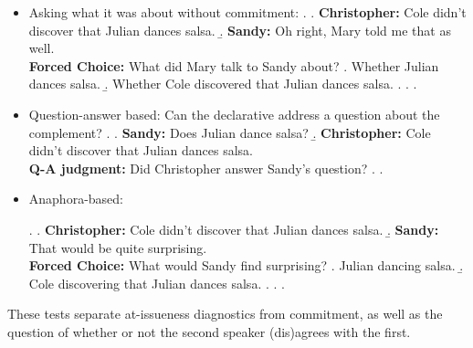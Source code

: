 \documentclass[11pt]{article}
\begin{document}
		\begin{itemize}
			\item Asking what it was about without commitment:
				\ex. \a. \textbf{Christopher:} Cole didn’t discover that Julian dances salsa.
					\b. \textbf{Sandy:} Oh right, Mary told me that as well.\\
					\textbf{Forced Choice:} What did Mary talk to Sandy about?
						\a. Whether Julian dances salsa.
						\b. Whether Cole discovered that Julian dances salsa.
						\z.
					\z.
				\z.

			\item Question-answer based: Can the declarative address a question about the complement?
				\ex. \a. \textbf{Sandy:} Does Julian dance salsa?
					\b. \textbf{Christopher:} Cole didn’t discover that Julian dances salsa.\\
						\textbf{Q-A judgment:} Did Christopher answer Sandy's question?
					\z.
				\z. 

			\item Anaphora-based:

				\ex. \a. \textbf{Christopher:} Cole didn’t discover that Julian dances salsa.
					\b. \textbf{Sandy:} That would be quite surprising.\\
					\textbf{Forced Choice:} What would Sandy find surprising?
						\a. Julian dancing salsa.
						\b. Cole discovering that Julian dances salsa.
						\z.
					\z.
				\z.

		\end{itemize}

		\noindent These tests separate at-issueness diagnostics from commitment, as well as the question of whether or not the second speaker (dis)agrees with the first.
		
\end{document}
